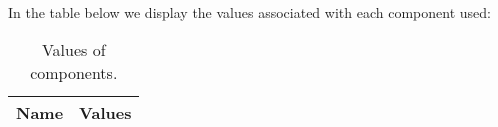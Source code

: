 \paragraph{} In the table below we display the values associated with each component used:

\begin{table}[h]
  \centering
  \begin{tabular}{|l|r|}
    \hline    
    {\bf Name} & {\bf Values} \\ \hline
     
  \end{tabular}
  \caption{Values of components.}
  \label{tab:data}
\end{table}
